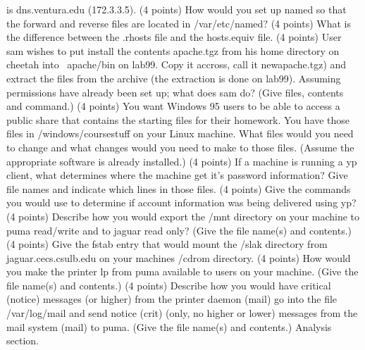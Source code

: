 is {\ltt{}dns.ventura.edu} ({\ltt{}172.3.3.5}).
\vfill\eject
\ques
(4 points)
How would you set up {\ltt{}named} so that the forward and reverse
files are located in {\ltt{}/var/etc/named}?
\vskip 1.2in
\ques
(4 points)
What is the difference between the {\ltt{}.rhosts} file and
the {\ltt{}hosts.equiv} file.
\vskip 1.8in
\ques
(4 points)
User {\ltt{}sam} wishes to put install the contents
{\ltt{}apache.tgz} from his home directory on {\ltt{}cheetah}
into {\ltt{}~apache/bin} on {\ltt{}lab99}. Copy
it accross, call it {\ltt{}newapache.tgz}) and extract the files from
the archive (the extraction is done on {\ltt{}lab99}).
Assuming permissions have already been set up;
what does {\ltt{}sam} do? (Give files, contents and command.)
\vskip 2.0in
\ques
(4 points)
You want Windows 95 users to be able to access a public share
that contains the starting files for their homework.
You have those files in {\ltt{}/windows/coursestuff}
on your Linux machine.
What files would you need to change and what
changes would you need to make to those files.
(Assume the appropriate software is already installed.)
\vskip 1.3in
\vfill\eject
\ques
(4 points)
If a machine is running a yp client, what determines where
the machine get it's password information? Give file names
and indicate which lines in those files.
\vskip 1.2in
\ques
(4 points)
Give the commands you would use to determine if
account information was being delivered using yp?
\vskip 1.1in
\ques
(4 points)
Describe how you would
export the {\ltt{}/mnt} directory on your machine to
puma read/write
and to jaguar read only?
(Give the file name(s) and contents.)
\vskip 1.0in
\ques
(4 points)
Give the {\ltt{}fstab} entry that would mount
the {\ltt{}/slak} directory from {\ltt{}jaguar.cecs.csulb.edu}
on your machines {\ltt{}/cdrom} directory.
\vskip 0.8in
\ques
(4 points)
How would you make the printer {\ltt{}lp} from
{\ltt{}puma} available to users on your machine.
(Give the file name(s) and contents.)
\vskip 1.0in
\ques
(4 points)
Describe how you would have
critical ({\ltt{}notice}) messages (or higher) from the printer daemon 
({\ltt{}mail})
go into the file {\ltt{}/var/log/mail}
and
send notice ({\ltt{}crit}) (only, no higher or lower)
messages from the mail system ({\ltt{}mail}) to {\ltt{}puma}.
(Give the file name(s) and contents.)
\vskip 1.5in
\vfill\eject
Analysis section. 

